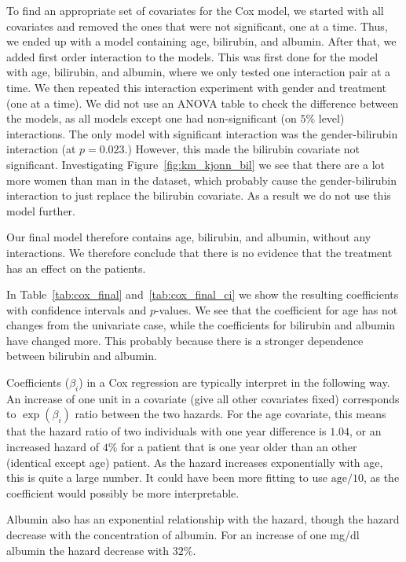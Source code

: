 \documentclass[11pt,a4paper]{article}
\begin{document}
To find an appropriate set of covariates for the Cox model, we started with all covariates and removed the ones that were not significant, one at a time. Thus, we ended up with a model containing age, bilirubin, and albumin.
After that, we added first order interaction to the models. This was first done for the model with age, bilirubin, and albumin, where we only tested one interaction pair at a time. We then repeated this interaction experiment with gender and treatment (one at a time). We did not use an ANOVA table to check the difference between the models, as all models except one had non-significant (on $5\%$ level) interactions.
The only model with significant interaction was the gender-bilirubin interaction (at $p=0.023$.) However, this made the bilirubin covariate not significant. Investigating Figure~\ref{fig:km_kjonn_bil} we see that there are a lot more women than man in the dataset, which probably cause the gender-bilirubin interaction to just replace the bilirubin covariate. As a result we do not use this model further.

Our final model therefore contains age, bilirubin, and albumin, without any interactions. We therefore conclude that there is no evidence that the treatment has an effect on the patients.

In Table~\ref{tab:cox_final} and~\ref{tab:cox_final_ci} we show the resulting coefficients with confidence intervals and $p$-values. We see that the coefficient for age has not changes from the univariate case, while the coefficients for bilirubin and albumin have changed more. This probably because there is a stronger dependence between bilirubin and albumin.

Coefficients ($\beta_i$) in a Cox regression are typically interpret in the following way. An increase of one unit in a covariate (give all other covariates fixed) corresponds to $\exp(\beta_i)$ ratio between the two hazards.
For the age covariate, this means that the hazard ratio of two individuals with one year difference is $1.04$, or an increased hazard of $4\%$ for a patient that is one year older than an other (identical except age) patient. As the hazard increases exponentially with age, this is quite a large number. It could have been more fitting to use $\text{age}/ 10$, as the coefficient would possibly be more interpretable.

Albumin also has an exponential relationship with the hazard, though the hazard decrease with the concentration of albumin. For an increase of one mg/dl albumin the hazard decrease with $32\%$.
\end{document}
